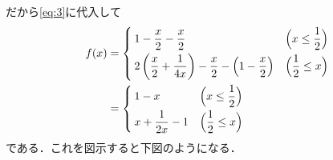 \documentclass[../../main.tex]{subfiles}
\begin{document}
だから\cref{eq:3}に代入して
\begin{align}
  f(x)&=
  \begin{cases}
    \displaystyle 1 - \dfrac{x}{2} - \dfrac{x}{2}  & \Bigl(x\le\dfrac{1}{2}\Bigr)\\[2mm]
    \displaystyle 2\left(\dfrac{x}{2} + \dfrac{1}{4x}\right) - \dfrac{x}{2} - \left(1 - \dfrac{x}{2}\right) & \Bigl(\dfrac{1}{2}\le x\Bigr)
  \end{cases} \\
  &=
  \begin{cases}
    \displaystyle 1 - x  & \Bigl(x\le\dfrac{1}{2}\Bigr)\\[2mm]
    \displaystyle x  + \dfrac{1}{2x} - 1 & \Bigl(\dfrac{1}{2}\le x\Bigr)
  \end{cases} \label{eq:4}
\end{align}
である．これを図示すると下図のようになる．
\end{document}
